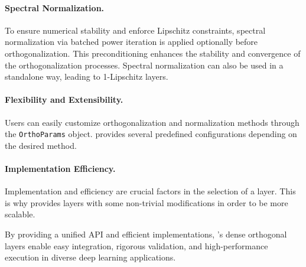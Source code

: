         
        
    
    \paragraph{Spectral Normalization.}
    To ensure numerical stability and enforce Lipschitz constraints, spectral normalization via batched power iteration is applied optionally before orthogonalization. This preconditioning enhances the stability and convergence of the orthogonalization processes. Spectral normalization can also be used in a standalone way, leading to 1-Lipschitz layers.
    
    \paragraph{Flexibility and Extensibility.}
    Users can easily customize orthogonalization and normalization methods through the \verb|OrthoParams| object. \Orthogonium provides several predefined configurations depending on the desired method.
    
    \paragraph{Implementation Efficiency.}
    Implementation and efficiency are crucial factors in the selection of a layer. This is why \Orthogonium provides layers with some non-trivial modifications in order to be more scalable. 
    
    By providing a unified API and efficient implementations, \Orthogonium's dense orthogonal layers enable easy integration, rigorous validation, and high-performance execution in diverse deep learning applications.


